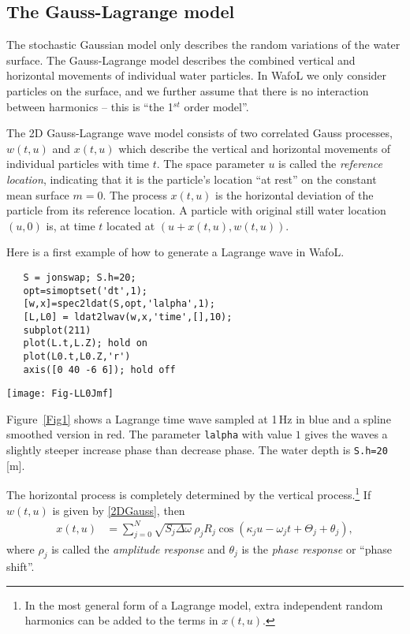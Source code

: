 \subsection{The Gauss-Lagrange model}\label{ss:GaussLagrange}
The stochastic Gaussian model only describes the random variations of the water surface. The Gauss-Lagrange model describes the combined vertical and horizontal movements of individual water particles.   In {\sc Wafo}L we only consider particles on the surface, and we further assume that there is no interaction between harmonics -- this is ``the 1$^{st}$ order model''.

The 2D Gauss-Lagrange wave model consists of two correlated Gauss processes,
$w(t,u)$ and $ x(t,u)$ which describe the vertical and horizontal movements of individual particles  with time $t$. The space parameter $u$ is called the {\it reference location}, indicating that it is the particle's location ``at rest'' on the constant mean surface $m=0$. The process $x(t,u)$  is the horizontal deviation of the particle from its reference location. A particle with original still water location  $(u,0)$ is, at time  $t$ located at $(u+x(t,u), w(t,u))$.

Here is a first example of how to generate a Lagrange wave in {\sc Wafo}L.
{\small\begin{verbatim}
   S = jonswap; S.h=20;
   opt=simoptset('dt',1);
   [w,x]=spec2ldat(S,opt,'lalpha',1);
   [L,L0] = ldat2lwav(w,x,'time',[],10);
   subplot(211)
   plot(L.t,L.Z); hold on
   plot(L0.t,L0.Z,'r')
   axis([0 40 -6 6]); hold off
\end{verbatim}}

\begin{SCfigure}[1][t]
\texttt{[image: Fig-LL0Jmf]}
\caption{Lagrange wave in time with slight front-back asymmetry.}
\label{Fig1}
\end{SCfigure}

Figure~\ref{Fig1} shows a Lagrange time wave sampled at 1\,Hz in blue and a spline smoothed version in red.  The parameter {\tt lalpha} with value $1$ gives the waves a slightly steeper increase phase than decrease phase. The water depth is  {\tt S.h=20} [m].

The horizontal process is completely determined by the vertical
process.\footnote{In the most general form of a Lagrange model,  extra independent random harmonics can be added to the terms in $x(t,u)$. } If $w(t,u)$ is given by
\eqref{2DGauss}, then
\begin{align}
x(t,u) &= \sum_{j=0}^N \sqrt{S_j  \Delta \omega}\, \rho_j R_j \cos (\kappa_j u - \omega _j t + \Theta _j + \theta_j), \label{2DLagrange}
\end{align}
where $\rho_j$ is called the  {\it amplitude response} and $\theta_j$ is the {\it phase response} or ``phase shift''.

